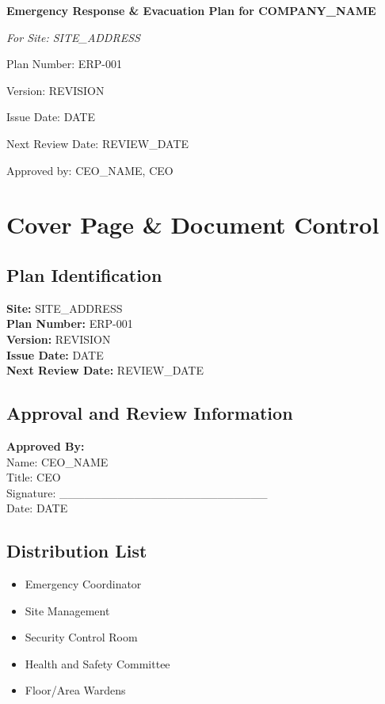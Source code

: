 \documentclass[12pt]{article}
\begin{document}
\begin{titlepage}
    \centering
    \vspace*{2cm}
    {\LARGE\bfseries Emergency Response \& Evacuation Plan for {{COMPANY_NAME}}\par}
    \vspace{1cm}
    {\large\itshape For Site: {{SITE_ADDRESS}}\par}
    \vspace{0.5cm}
    {\normalsize Plan Number: ERP-001\par}
    \vspace{0.5cm}
    {\normalsize Version: {{REVISION}}\par}
    \vspace{0.5cm}
    {\normalsize Issue Date: {{DATE}}\par}
    \vspace{0.5cm}
    {\normalsize Next Review Date: {{REVIEW_DATE}}\par}
    \vspace{2cm}
    {\normalsize Approved by: {{CEO_NAME}}, CEO\par}
\end{titlepage}

\section{Cover Page \& Document Control}

\subsection{Plan Identification}
\textbf{Site:} {{SITE_ADDRESS}}\\
\textbf{Plan Number:} ERP-001\\
\textbf{Version:} {{REVISION}}\\
\textbf{Issue Date:} {{DATE}}\\
\textbf{Next Review Date:} {{REVIEW_DATE}}

\subsection{Approval and Review Information}
\textbf{Approved By:}\\
Name: {{CEO_NAME}}\\
Title: CEO\\
Signature: _________________________\\
Date: {{DATE}}

\subsection{Distribution List}
\begin{itemize}
    \item Emergency Coordinator
    \item Site Management
    \item Security Control Room
    \item Health and Safety Committee
    \item Floor/Area Wardens
\end{itemize}
\end{document}
